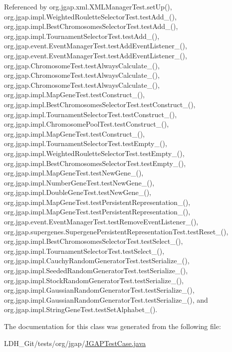 Referenced by org.\-jgap.\-xml.\-X\-M\-L\-Manager\-Test.\-set\-Up(), org.\-jgap.\-impl.\-Weighted\-Roulette\-Selector\-Test.\-test\-Add\-\_(), org.\-jgap.\-impl.\-Best\-Chromosomes\-Selector\-Test.\-test\-Add\-\_(), org.\-jgap.\-impl.\-Tournament\-Selector\-Test.\-test\-Add\-\_(), org.\-jgap.\-event.\-Event\-Manager\-Test.\-test\-Add\-Event\-Listener\-\_(), org.\-jgap.\-event.\-Event\-Manager\-Test.\-test\-Add\-Event\-Listener\-\_(), org.\-jgap.\-Chromosome\-Test.\-test\-Always\-Calculate\-\_(), org.\-jgap.\-Chromosome\-Test.\-test\-Always\-Calculate\-\_(), org.\-jgap.\-Chromosome\-Test.\-test\-Always\-Calculate\-\_(), org.\-jgap.\-impl.\-Map\-Gene\-Test.\-test\-Construct\-\_(), org.\-jgap.\-impl.\-Best\-Chromosomes\-Selector\-Test.\-test\-Construct\-\_(), org.\-jgap.\-impl.\-Tournament\-Selector\-Test.\-test\-Construct\-\_(), org.\-jgap.\-impl.\-Chromosome\-Pool\-Test.\-test\-Construct\-\_(), org.\-jgap.\-impl.\-Map\-Gene\-Test.\-test\-Construct\-\_(), org.\-jgap.\-impl.\-Tournament\-Selector\-Test.\-test\-Empty\-\_(), org.\-jgap.\-impl.\-Weighted\-Roulette\-Selector\-Test.\-test\-Empty\-\_(), org.\-jgap.\-impl.\-Best\-Chromosomes\-Selector\-Test.\-test\-Empty\-\_(), org.\-jgap.\-impl.\-Map\-Gene\-Test.\-test\-New\-Gene\-\_(), org.\-jgap.\-impl.\-Number\-Gene\-Test.\-test\-New\-Gene\-\_(), org.\-jgap.\-impl.\-Double\-Gene\-Test.\-test\-New\-Gene\-\_(), org.\-jgap.\-impl.\-Map\-Gene\-Test.\-test\-Persistent\-Representation\-\_(), org.\-jgap.\-impl.\-Map\-Gene\-Test.\-test\-Persistent\-Representation\-\_(), org.\-jgap.\-event.\-Event\-Manager\-Test.\-test\-Remove\-Event\-Listener\-\_(), org.\-jgap.\-supergenes.\-Supergene\-Persistent\-Representation\-Test.\-test\-Reset\-\_(), org.\-jgap.\-impl.\-Best\-Chromosomes\-Selector\-Test.\-test\-Select\-\_(), org.\-jgap.\-impl.\-Tournament\-Selector\-Test.\-test\-Select\-\_(), org.\-jgap.\-impl.\-Cauchy\-Random\-Generator\-Test.\-test\-Serialize\-\_(), org.\-jgap.\-impl.\-Seeded\-Random\-Generator\-Test.\-test\-Serialize\-\_(), org.\-jgap.\-impl.\-Stock\-Random\-Generator\-Test.\-test\-Serialize\-\_(), org.\-jgap.\-impl.\-Gaussian\-Random\-Generator\-Test.\-test\-Serialize\-\_(), org.\-jgap.\-impl.\-Gaussian\-Random\-Generator\-Test.\-test\-Serialize\-\_(), and org.\-jgap.\-impl.\-String\-Gene\-Test.\-test\-Set\-Alphabet\-\_().



The documentation for this class was generated from the following file\-:\begin{DoxyCompactItemize}
\item 
L\-D\-H\-\_\-\-Git/tests/org/jgap/\hyperlink{_j_g_a_p_test_case_8java}{J\-G\-A\-P\-Test\-Case.\-java}\end{DoxyCompactItemize}
